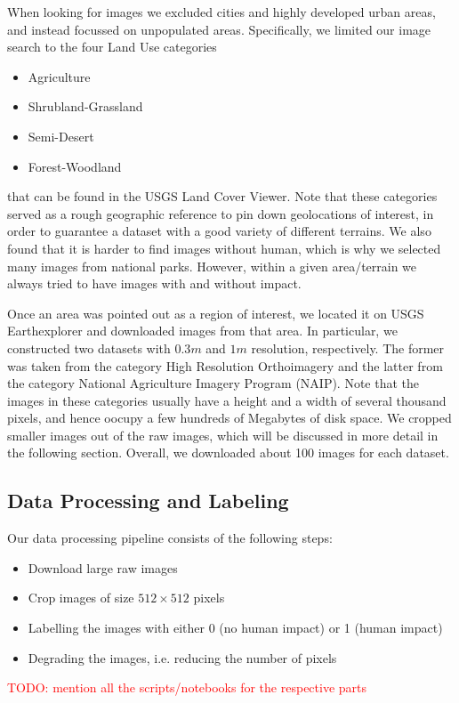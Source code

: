 When looking for images we excluded cities and highly developed urban areas, and instead focussed on unpopulated areas. Specifically, we limited our image search to the four Land Use categories
\begin{itemize}
	\item Agriculture
	\item Shrubland-Grassland
	\item Semi-Desert
	\item Forest-Woodland
\end{itemize}
that can be found in the USGS Land Cover Viewer. Note that these categories served as a rough geographic reference to pin down geolocations of interest, in order to guarantee a dataset with a good variety of different terrains. We also found that it is harder to find images without human, which is why we selected many images from national parks. However, within a given area/terrain we always tried to have images with and without impact.

Once an area was pointed out as a region of interest, we located it on USGS Earthexplorer and downloaded images from that area. In particular, we constructed two datasets with $0.3m$ and $1m$ resolution, respectively. The former was taken from the category High Resolution Orthoimagery and the latter from the category National Agriculture Imagery Program (NAIP). Note that the images in these categories usually have a height and a width of several thousand pixels, and hence oocupy a few hundreds of Megabytes of disk space. We cropped smaller images out of the raw images, which will be discussed in more detail in the following section. Overall, we downloaded about 100 images for each dataset.


\subsection{Data Processing and Labeling}
Our data processing pipeline consists of the following steps:
\begin{itemize}
	\item Download large raw images
	\item Crop images of size $512\times512$ pixels
	\item Labelling the images with either 0 (no human impact) or 1 (human impact)
	\item Degrading the images, i.e. reducing the number of pixels
\end{itemize}

\textcolor{red}{TODO: mention all the scripts/notebooks for the respective parts}

